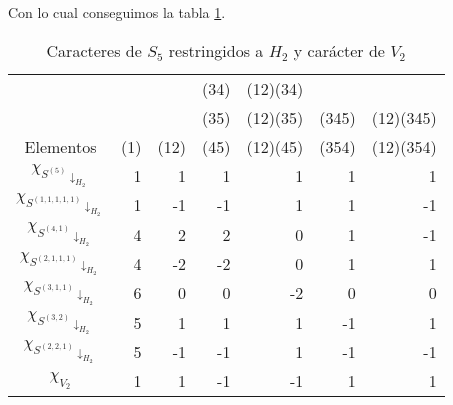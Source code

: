 \documentclass[12pt]{book}
\theoremstyle{definition}
\newcounter{in}
\begin{document}
Con lo cual conseguimos la tabla \ref{tab:clanes-H_2-5}.
\begin{table}[!hbtp]
  \centering
  \begin{tabular}{c |r r r r r r}
    &     &      & (34) & (12)(34) &       &  \\
    &     &      & (35) & (12)(35) & (345) & (12)(345) \\
    Elementos & (1) & (12) & (45) & (12)(45) & (354) & (12)(354) \\
    \hline
    $\chi_{S^{(5)}\downarrow_{H_{2}}}$ & 1 & 1  & 1  & 1 & 1 & 1 \\
    $\chi_{S^{(1,1,1,1,1)}\downarrow_{H_{2}}}$ & 1 & -1 & -1 & 1 & 1 & -1\\
    $\chi_{S^{(4,1)}\downarrow_{H_{2}}}$ & 4 & 2  & 2  & 0 & 1 & -1\\
    $\chi_{S^{(2,1,1,1)}\downarrow_{H_{2}}}$ & 4 & -2 & -2 & 0 & 1 & 1\\
    $\chi_{S^{(3,1,1)}\downarrow_{H_{2}}}$ & 6 & 0  & 0  & -2& 0 & 0\\
    $\chi_{S^{(3,2)}\downarrow_{H_{2}}}$ & 5 & 1  & 1  & 1 & -1& 1\\
    $\chi_{S^{(2,2,1)}\downarrow_{H_{2}}}$ & 5 & -1 & -1 & 1 & -1& -1\\
    \hline
    $\chi_{V_{2}}$ & 1 & 1 & -1 & -1& 1 & 1\\
  \end{tabular}

  \caption{Caracteres de $S_{5}$ restringidos a $H_{2}$ y carácter de $V_{2}$}
  \label{tab:clanes-H_2-5}
\end{table}
\end{document}

